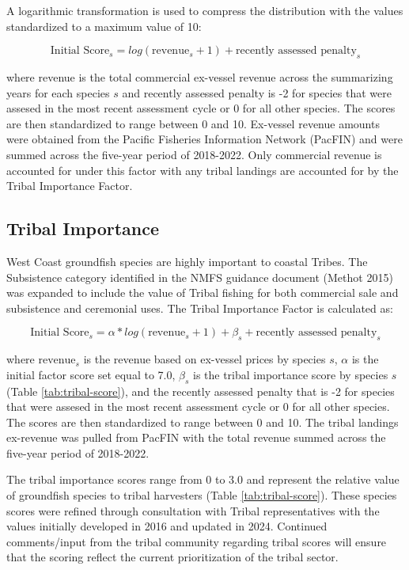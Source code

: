 \documentclass[11pt,
  english,
  a4paper,
]{article}
\begin{document}
A logarithmic transformation is used to compress the distribution with the values standardized to a maximum value of 10:

\begin{equation}
  \text{Initial Score}_{s} = log(\text{revenue}_s + 1) + \text{recently assessed penalty}_s
\end{equation}

where revenue is the total commercial ex-vessel revenue across the summarizing years for each species \(s\) and recently assessed penalty is -2 for species that were assesed in the most recent assessment cycle or 0 for all other species. The scores are then standardized to range between 0 and 10. Ex-vessel revenue amounts were obtained from the Pacific Fisheries Information Network (PacFIN) and were summed across the five-year period of 2018-2022. Only commercial revenue is accounted for under this factor with any tribal landings are accounted for by the Tribal Importance Factor.

\hypertarget{tribal-importance}{%
\subsection{Tribal Importance}\label{tribal-importance}}

West Coast groundfish species are highly important to coastal Tribes. The Subsistence category identified in the NMFS guidance document (Methot 2015) was expanded to include the value of Tribal fishing for both commercial sale and subsistence and ceremonial uses. The Tribal Importance Factor is calculated as:

\begin{equation}
\text{Initial Score}_{s} = \alpha * log(\text{revenue}_{s} + 1) + \beta_s + \text{recently assessed penalty}_s   
\end{equation}

where \(\text{revenue}_s\) is the revenue based on ex-vessel prices by species \(s\), \(\alpha\) is the initial factor score set equal to 7.0, \(\beta_s\) is the tribal importance score by species \(s\) (Table \ref{tab:tribal-score}), and the recently assessed penalty that is -2 for species that were assesed in the most recent assessment cycle or 0 for all other species. The scores are then standardized to range between 0 and 10. The tribal landings ex-revenue was pulled from PacFIN with the total revenue summed across the five-year period of 2018-2022.

The tribal importance scores range from 0 to 3.0 and represent the relative value of groundfish species to tribal harvesters (Table \ref{tab:tribal-score}). These species scores were refined through consultation with Tribal representatives with the values initially developed in 2016 and updated in 2024. Continued comments/input from the tribal community regarding tribal scores will ensure that the scoring reflect the current prioritization of the tribal sector.
\end{document}
